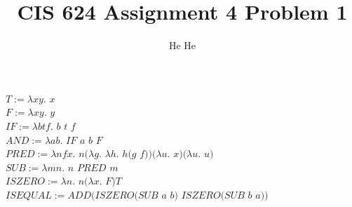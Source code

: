 \documentclass[12pt,letter]{article}
\numberwithin{equation}{section}
\begin{document}
\title{CIS 624 Assignment 4 Problem 1}

\author{He He}
\maketitle 

\noindent
$T := \lambda xy.$ $x$ \\
$F := \lambda xy.$ $y$ \\
$IF := \lambda btf.$ $b$ $t$ $f$\\
$AND := \lambda ab.$ $IF$ $a$ $b$ $F$\\
$PRED := \lambda nfx.$ $n (\lambda g.$ $\lambda h.$ $h ( g$ $f )) (\lambda u.$ $x) (\lambda u.$ $u)$\\
$SUB := \lambda mn.$ $n$ $PRED$ $m$ \\
$ISZERO := \lambda n.$ $n (\lambda x.$ $F) T$ \\
$ISEQUAL := ADD(ISZERO(SUB$ $a$ $b)$ $ISZERO(SUB$ $b$ $a))$ \\


	
	
	
	
	
	
	
	
\end{document}
